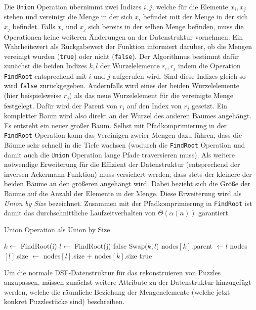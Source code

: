 \documentclass{whswinvcbook}
\begin{document}
Die \texttt{Union} Operation übernimmt zwei Indizes $i,j$, welche für die Elemente $x_i,x_j$ stehen und vereinigt die Menge in der sich $x_i$ befindet mit der Menge in der sich $x_j$ befindet. Falls $x_i$ und $x_j$ sich bereits in der selben Menge befinden, muss die Operationen keine weiteren Änderungen an der Datenstruktur vornehmen. Ein Wahrheitswert als Rückgabewert der Funktion informiert darüber, ob die Mengen vereinigt wurden (\texttt{true}) oder nicht (\texttt{false}). Der Algorithmus bestimmt dafür zunächst die beiden Indizes $k,l$ der Wurzelelemente $r_i,r_j$ indem die Operation \texttt{FindRoot} entsprechend mit $i$ und $j$ aufgerufen wird. Sind diese Indizes gleich so wird \texttt{false} zurückgegeben. Andernfalls wird eines der beiden Wurzelelemente (hier beispielsweise $r_j$) als das neue Wurzelelement für die vereinigte Menge festgelegt. Dafür wird der Parent von $r_i$ auf den Index von $r_j$ gesetzt. Ein kompletter Baum wird also direkt an der Wurzel des anderen Baumes angehängt. Es entsteht ein neuer großer Baum. Selbst mit Pfadkomprimierung in der \texttt{FindRoot} Operation kann das Vereinigen zweier Mengen dazu führen, dass die Bäume sehr schnell in die Tiefe wachsen (wodurch die \texttt{FindRoot} Operation und damit auch die \texttt{Union} Operation lange Pfade traversieren muss). Als weitere notwendige Erweiterung für die Effizient der Datenstruktur (entsprechend der inversen Ackermann-Funktion) muss versichert werden, dass stets der kleinere der beiden Bäume an den größeren angehängt wird. Dabei bezieht sich die Größe der Bäume auf die Anzahl der Elemente in der Menge. Diese Erweiterung wird als \textit{Union by Size} bezeichnet. Zusammen mit der Pfadkomprimierung in \texttt{FindRoot} ist damit das durchschnittliche Laufzeitverhalten von $\Theta(\alpha(n))$ garantiert.
\begin{algorithm}[H]
    \caption{Union Operation als Union by Size}\label{alg-dsf-union}
    \begin{algorithmic}
            \State $k\gets$ FindRoot(i)
            \State $l\gets$ FindRoot(j)
                \State \Return false
            \EndIf
                \State Swap($k,l$)
            \EndIf
            \State nodes$[k]$.parent $\gets l$
            \State nodes$[l]$.size $\gets$ nodes$[l]$.size $+$ nodes$[k]$.size
            \State \Return true
        \EndFunction
    \end{algorithmic}
\end{algorithm}
Um die normale DSF-Datenstruktur für das rekonstruieren von Puzzles anzupassen, müssen zunächst weitere Attribute zu der Datenstruktur hinzugefügt werden, welche die räumliche Beziehung der Mengenelemente (welche jetzt konkret Puzzlestücke sind) beschreiben.
\end{document}

